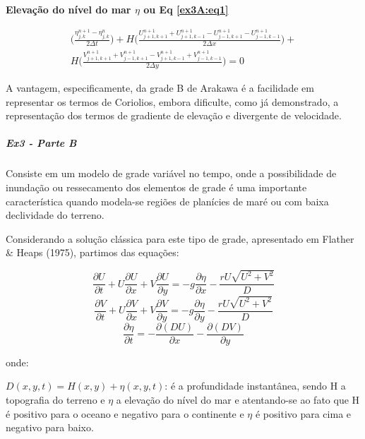 \documentclass[11pt]{article}
\begin{document}
\textbf{Elevação do nível do mar \(\eta\) ou Eq \ref{ex3A:eq1}}

\begin{equation}
\begin{aligned}
\bigg( \frac{\eta^{n+1}_{j,k} - \eta^{n}_{j,k}}{2\Delta{t}} \bigg) +
H\bigg( \frac{U^{n+1}_{j+1,k+1} + U^{n+1}_{j+1,k-1} - U^{n+1}_{j-1,k+1} - U^{n+1}_{j-1,k-1}}{2\Delta{x}} \bigg) + \\
H\bigg( \frac{V^{n+1}_{j+1,k+1} + V^{n+1}_{j-1,k+1} - V^{n+1}_{j+1,k-1} + V^{n+1}_{j-1,k-1}}{2\Delta{y}} \bigg) = 0
\label{ex3A:eq6}
\end{aligned}
\end{equation}
\bigskip

A vantagem, especificamente, da grade B de Arakawa é a facilidade em
representar os termos de Coriolios, embora dificulte, como já
demonstrado, a representação dos termos de gradiente de elevação e
divergente de velocidade.

\subparagraph{Ex3 - Parte B}\label{ex3---parte-b}

Consiste em um modelo de grade variável no tempo, onde a possibilidade
de inundação ou ressecamento dos elementos de grade é uma importante
característica quando modela-se regiões de planícies de maré ou com
baixa declividade do terreno.

Considerando a solução clássica para este tipo de grade, apresentado em
Flather \& Heaps (1975), partimos das equações:

\begin{equation}
    \frac{\partial{U}}{\partial{t}} + U\frac{\partial{U}}{\partial{x}} + V\frac{\partial{U}}{\partial{y}} = -g\frac{\partial{\eta}}{\partial{x}} - \frac{rU\sqrt{U^2 + V^2}}{D}
    \label{ex3B:eq1}
\end{equation}\begin{equation}
    \frac{\partial{V}}{\partial{t}} + U\frac{\partial{V}}{\partial{x}} + V\frac{\partial{V}}{\partial{y}} = -g\frac{\partial{\eta}}{\partial{y}} - \frac{rU\sqrt{U^2 + V^2}}{D}
    \label{ex3B:eq2}
\end{equation}\begin{equation}
    \frac{\partial{\eta}}{\partial{t}} = -\frac{\partial{(DU)}}{\partial{x}} - \frac{\partial{(DV)}}{\partial{y}}
    \label{ex3B:eq3}
\end{equation}

onde:

\(D(x,y,t) = H(x,y) + \eta(x,y,t)\): é a profundidade instantânea, sendo
H a topografia do terreno e \(\eta\) a elevação do nível do mar e
atentando-se ao fato que H é positivo para o oceano e negativo para o
continente e \(\eta\) é positivo para cima e negativo para baixo.
\end{document}
